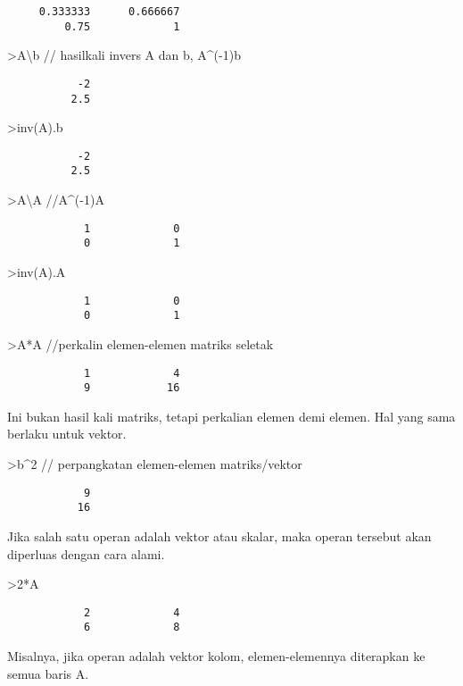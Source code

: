 \documentclass[
]{book}
\begin{document}
\begin{verbatim}
     0.333333      0.666667 
         0.75             1 
\end{verbatim}

\textgreater A\textbackslash b // hasilkali invers A dan b, A\^{}(-1)b

\begin{verbatim}
           -2 
          2.5 
\end{verbatim}

\textgreater inv(A).b

\begin{verbatim}
           -2 
          2.5 
\end{verbatim}

\textgreater A\textbackslash A //A\^{}(-1)A

\begin{verbatim}
            1             0 
            0             1 
\end{verbatim}

\textgreater inv(A).A

\begin{verbatim}
            1             0 
            0             1 
\end{verbatim}

\textgreater A*A //perkalin elemen-elemen matriks seletak

\begin{verbatim}
            1             4 
            9            16 
\end{verbatim}

Ini bukan hasil kali matriks, tetapi perkalian elemen demi elemen. Hal yang sama berlaku untuk vektor.

\textgreater b\^{}2 // perpangkatan elemen-elemen matriks/vektor

\begin{verbatim}
            9 
           16 
\end{verbatim}

Jika salah satu operan adalah vektor atau skalar, maka operan tersebut akan diperluas dengan cara alami.

\textgreater2*A

\begin{verbatim}
            2             4 
            6             8 
\end{verbatim}

Misalnya, jika operan adalah vektor kolom, elemen-elemennya diterapkan ke semua baris A.
\end{document}

